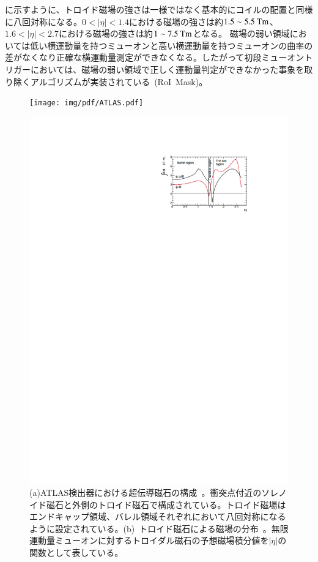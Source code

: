 に示すように、トロイド磁場の強さは一様ではなく基本的にコイルの配置と同様に八回対称になる。$0<|\eta|<1.4$における磁場の強さは約$1.5\sim5.5~\rm{Tm}$、$1.6<|\eta|<2.7$における磁場の強さは約$1\sim7.5~\rm{Tm}$となる。
磁場の弱い領域においては低い横運動量を持つミューオンと高い横運動量を持つミューオンの曲率の差がなくなり正確な横運動量測定ができなくなる。したがって初段ミューオントリガーにおいては、磁場の弱い領域で正しく運動量判定ができなかった事象を取り除くアルゴリズムが実装されている~(RoI~Mask)。
\begin{figure}[tbp]
        \begin{minipage}{0.49\hsize}
        \centering   
        \texttt{[image: img/pdf/ATLAS.pdf]}
        \subcaption{}
        \end{minipage}
        \begin{minipage}{0.49\hsize}
	    \centering
	    \includegraphics[width=\textwidth,page=1]{img/pdf/mag.pdf}
	    \subcaption{}
	    \end{minipage}
        \caption[ATLAS~検出器における超伝導磁石の構成とトロイド磁石による磁場の分布]{(a)ATLAS検出器における超伝導磁石の構成~\cite{TR:01}。衝突点付近のソレノイド磁石と外側のトロイド磁石で構成されている。トロイド磁場はエンドキャップ領域、バレル領域それぞれにおいて八回対称になるように設定されている。(b)~トロイド磁石による磁場の分布~\cite{TR:01}。無限運動量ミューオンに対するトロイダル磁石の予想磁場積分値を$|\eta|$の関数として表している。}\label{fig:mag}
\end{figure}

